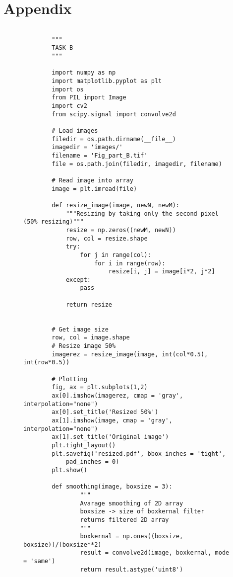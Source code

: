 {%
\newpage
\section{Appendix}

\begin{figure}[hbt!]
    \begin{lstlisting}

        """
        TASK B
        """
        
        import numpy as np 
        import matplotlib.pyplot as plt
        import os
        from PIL import Image
        import cv2
        from scipy.signal import convolve2d
        
        # Load images
        filedir = os.path.dirname(__file__)
        imagedir = 'images/'
        filename = 'Fig_part_B.tif'
        file = os.path.join(filedir, imagedir, filename)
        
        # Read image into array
        image = plt.imread(file)
        
        def resize_image(image, newN, newM):
            """Resizing by taking only the second pixel (50% resizing)"""
            resize = np.zeros((newM, newN))
            row, col = resize.shape
            try:
                for j in range(col):
                    for i in range(row):
                        resize[i, j] = image[i*2, j*2]
            except:
                pass
        
            return resize
        
        
        # Get image size
        row, col = image.shape
        # Resize image 50%
        imagerez = resize_image(image, int(col*0.5), int(row*0.5))
        
        # Plotting
        fig, ax = plt.subplots(1,2)
        ax[0].imshow(imagerez, cmap = 'gray', interpolation="none")
        ax[0].set_title('Resized 50%')
        ax[1].imshow(image, cmap = 'gray', interpolation="none")
        ax[1].set_title('Original image')
        plt.tight_layout()
        plt.savefig('resized.pdf', bbox_inches = 'tight',
            pad_inches = 0)
        plt.show()
        
        def smoothing(image, boxsize = 3):
                """
                Avarage smoothing of 2D array
                boxsize -> size of boxkernal filter
                returns filtered 2D array
                """
                boxkernal = np.ones((boxsize, boxsize))/(boxsize**2)
                result = convolve2d(image, boxkernal, mode = 'same')
                return result.astype('uint8')
        

\end{lstlisting}
\end{figure}}
